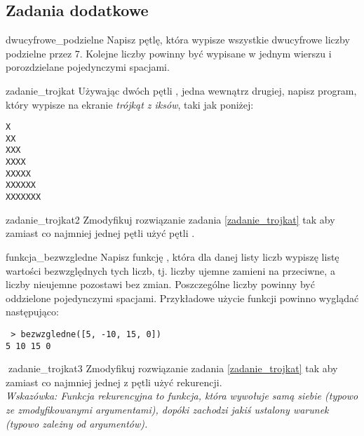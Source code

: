 \documentclass{pdfBooklets}
\begin{document}
\subsection{Zadania dodatkowe}
\begin{Zadanie}{}{dwucyfrowe_podzielne} %
Napisz pętlę, która wypisze wszystkie dwucyfrowe liczby podzielne przez 7.
Kolejne liczby powinny być wypisane w jednym wierszu i porozdzielane pojedynczymi spacjami.
\end{Zadanie}

\begin{Zadanie}{}{zadanie_trojkat}
Używając dwóch pętli , jedna wewnątrz drugiej, napisz program, który wypisze na ekranie
\textit{trójkąt z iksów}, taki jak poniżej:
\begin{Verbatim}
X
XX
XXX
XXXX
XXXXX
XXXXXX
XXXXXXX
\end{Verbatim}
\end{Zadanie}

\begin{Zadanie}{}{zadanie_trojkat2}
Zmodyfikuj rozwiązanie zadania \ref{zadanie_trojkat} tak aby zamiast co najmniej jednej pętli  użyć pętli .
\end{Zadanie}

\begin{Zadanie}{}{funkcja_bezwzgledne}
Napisz funkcję , która dla danej listy liczb wypiszę listę wartości bezwzględnych
tych liczb, tj. liczby ujemne zamieni na przeciwne, a liczby nieujemne pozostawi bez zmian.
Poszczególne liczby powinny być oddzielone pojedynczymi spacjami.
Przykładowe użycie funkcji powinno wyglądać następująco:
\begin{Verbatim}
 > bezwzgledne([5, -10, 15, 0])
5 10 15 0
\end{Verbatim}
\end{Zadanie}

\begin{Zadanie}{ {\Symbola 🤔}}{zadanie_trojkat3}
Zmodyfikuj rozwiązanie zadania \ref{zadanie_trojkat} tak aby zamiast co najmniej jednej z pętli użyć rekurencji.\\
\emph{Wskazówka: Funkcja rekurencyjna to funkcja, która wywołuje samą siebie (typowo ze zmodyfikowanymi argumentami), dopóki zachodzi jakiś ustalony warunek (typowo zależny od argumentów).}
\end{Zadanie}
\end{document}
